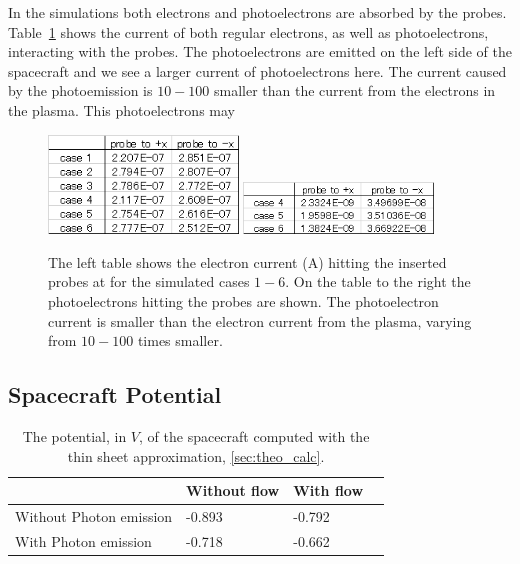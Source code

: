 In the simulations both electrons and photoelectrons are absorbed by the probes. Table~\ref{tab:elec_current} shows the current
of both regular electrons, as well as photoelectrons, interacting with the probes.
The photoelectrons are emitted on the left side of the spacecraft and we see a larger current of
photoelectrons here. The current caused by the photoemission is \(10-100\) smaller than the current
from the electrons in the plasma. This photoelectrons may

\begin{figure}[h]
	\includegraphics[width = 0.45\textwidth]{images/caliculation_of_electron_current}
	\includegraphics[width = 0.45\textwidth]{images/caliculation_of_PE_current}
	\caption{The left table shows the electron current (A) hitting the inserted probes at
	for the simulated cases \(1-6\). On the table to the right the photoelectrons hitting the probes are shown.
	The photoelectron current is smaller than the electron current from the plasma, varying from \(10-100\) times smaller.}
	\label{tab:elec_current}
\end{figure}


\subsection{Spacecraft Potential}
\begin{table}
\begin{center}
    \begin{tabular}{ | l | l | l | p{5cm} |}
    \hline
     & Without flow & With flow  \\ \hline
     Without Photon emission & -0.893   & -0.792 \\ \hline
     With Photon emission & -0.718 & -0.662 \\
    \hline
    \end{tabular}
	\caption{The potential, in \(V\), of the spacecraft computed with the thin sheet approximation, \ref{sec:theo_calc}.}
\end{center}
\end{table}

